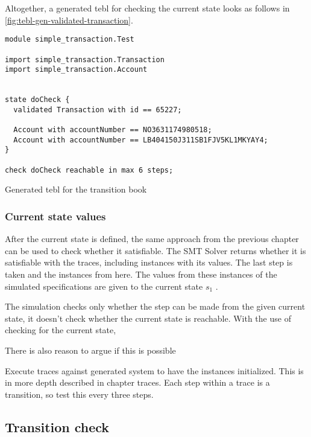 Altogether, a generated tebl for checking the current state looks as follows in \autoref{fig:tebl-gen-validated-transaction}.

\begin{sourcecode}[h!]
\begin{lstlisting}[]
module simple_transaction.Test

import simple_transaction.Transaction
import simple_transaction.Account


state doCheck {
  validated Transaction with id == 65227;
  
  Account with accountNumber == NO3631174980518; 
  Account with accountNumber == LB404150J311SB1FJV5KL1MKYAY4;
}

check doCheck reachable in max 6 steps;
\end{lstlisting}
\caption{Generated tebl for the transition book}
\label{fig:tebl-gen-validated-transaction}
\end{sourcecode}

\subsubsection*{Current state values}
After the current state is defined, the same approach from the previous chapter can be used to check whether it satisfiable. The SMT Solver returns whether it is satisfiable with the traces, including instances with its values. The last step is taken and the instances from here. The values from these instances of the simulated specifications are given to the current state $s_{1}$ .

The simulation checks only whether the step can be made from the given current state, it doesn't check whether the current state is reachable. With the use of checking for the current state, 


There is also reason to argue if this is possible



Execute traces against generated system to have the instances initialized. This is in more depth described in chapter traces. Each step within a trace is a transition, so test this every three steps.

\subsection{Transition check}

